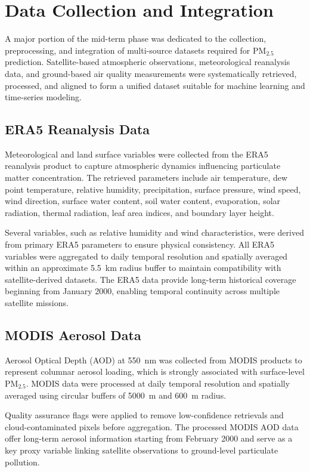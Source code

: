 \documentclass[12pt]{report}
\begin{document}
\section{Data Collection and Integration}

A major portion of the mid-term phase was dedicated to the collection, preprocessing, and integration of multi-source datasets required for PM$_{2.5}$ prediction. Satellite-based atmospheric observations, meteorological reanalysis data, and ground-based air quality measurements were systematically retrieved, processed, and aligned to form a unified dataset suitable for machine learning and time-series modeling.

\subsection{ERA5 Reanalysis Data}

Meteorological and land surface variables were collected from the ERA5 reanalysis product to capture atmospheric dynamics influencing particulate matter concentration. The retrieved parameters include air temperature, dew point temperature, relative humidity, precipitation, surface pressure, wind speed, wind direction, surface water content, soil water content, evaporation, solar radiation, thermal radiation, leaf area indices, and boundary layer height.

Several variables, such as relative humidity and wind characteristics, were derived from primary ERA5 parameters to ensure physical consistency. All ERA5 variables were aggregated to daily temporal resolution and spatially averaged within an approximate 5.5~km radius buffer to maintain compatibility with satellite-derived datasets. The ERA5 data provide long-term historical coverage beginning from January 2000, enabling temporal continuity across multiple satellite missions.

\subsection{MODIS Aerosol Data}

Aerosol Optical Depth (AOD) at 550~nm was collected from MODIS products to represent columnar aerosol loading, which is strongly associated with surface-level PM$_{2.5}$. MODIS data were processed at daily temporal resolution and spatially averaged using circular buffers of 5000~m and 600~m radius.

Quality assurance flags were applied to remove low-confidence retrievals and cloud-contaminated pixels before aggregation. The processed MODIS AOD data offer long-term aerosol information starting from February 2000 and serve as a key proxy variable linking satellite observations to ground-level particulate pollution.
\end{document}
